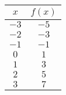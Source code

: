 \begin{tabular}{cc} \toprule
$x$  & $f(x)$ \\\midrule
$-3$ & $-5$   \\[6pt]
$-2$ & $-3$   \\[6pt]
$-1$ & $-1$   \\[6pt]
$0$  & $1$    \\[6pt]
$1$  & $3$    \\[6pt]
$2$  & $5$    \\[6pt]
$3$  & $7$    \\\bottomrule
\end{tabular}
